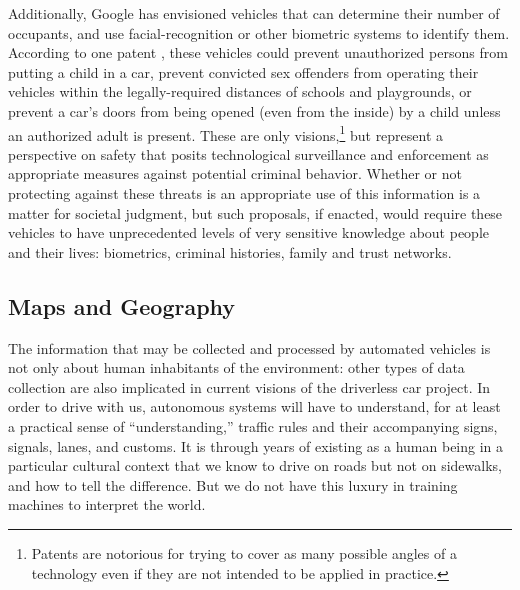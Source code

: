 Additionally, Google has envisioned vehicles that can determine their number of
occupants, and use facial-recognition or other biometric systems to
identify them. According to one patent \cite{predictPatent}, these vehicles could prevent
unauthorized persons from putting a child in a car, prevent convicted
sex offenders from operating their vehicles within the
legally-required distances of schools and playgrounds, or prevent a
car's doors from being opened (even from the inside) by a child unless
an authorized adult is present. These are only visions,\footnote{Patents
are notorious for trying to cover as many possible angles of a
technology even if they are not intended to be applied in practice.} 
but represent a perspective on safety 
that posits technological surveillance and enforcement as
appropriate measures against potential criminal behavior. Whether or not protecting
against these threats is an appropriate use of this information is a
matter for societal judgment, but such proposals, if enacted, would
require these vehicles to have unprecedented levels of very sensitive
knowledge about people and their lives: biometrics, criminal
histories, family and trust networks. 





\subsection{Maps and Geography}



The information that may be collected and processed by automated
vehicles is not only about human inhabitants of the environment: other
types of data collection are also implicated in current
visions of the driverless car project. In order to drive with us,
autonomous systems will have to understand,
for at least a practical sense of ``understanding,'' traffic rules and
their accompanying signs, signals, lanes, and customs. It is through
years of existing as a human being
in a particular cultural context that we know to drive on roads but
not on sidewalks, and how to tell the difference. But we do not have
this luxury in training machines to interpret the world.


